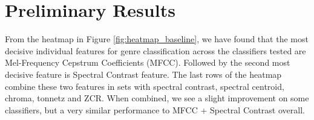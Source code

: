 \section{Preliminary Results}

\begin{figure*}[ht]
    
    \caption{}
    \label{fig:heatmap_baseline}
\end{figure*}




From the heatmap in Figure \ref{fig:heatmap_baseline}, we have found that the most decisive individual features for genre classification across the classifiers tested are Mel-Frequency Cepstrum Coefficients (MFCC). Followed by the second most decisive feature is Spectral Contrast feature. The last rows of the heatmap combine these two features in sets with spectral contrast, spectral centroid, chroma, tonnetz and ZCR. When combined, we see a slight improvement on some classifiers, but a very similar performance to MFCC + Spectral Contrast overall.

